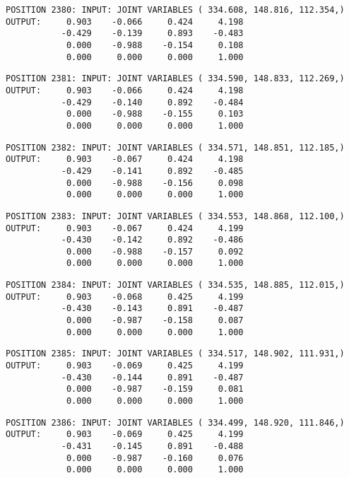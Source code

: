 \begin{verbatim}
POSITION 2380: INPUT: JOINT VARIABLES ( 334.608, 148.816, 112.354,)
OUTPUT:     0.903    -0.066     0.424     4.198
           -0.429    -0.139     0.893    -0.483
            0.000    -0.988    -0.154     0.108
            0.000     0.000     0.000     1.000
\end{verbatim} \pagebreak[1]\begin{verbatim}
POSITION 2381: INPUT: JOINT VARIABLES ( 334.590, 148.833, 112.269,)
OUTPUT:     0.903    -0.066     0.424     4.198
           -0.429    -0.140     0.892    -0.484
            0.000    -0.988    -0.155     0.103
            0.000     0.000     0.000     1.000
\end{verbatim} \pagebreak[1]\begin{verbatim}
POSITION 2382: INPUT: JOINT VARIABLES ( 334.571, 148.851, 112.185,)
OUTPUT:     0.903    -0.067     0.424     4.198
           -0.429    -0.141     0.892    -0.485
            0.000    -0.988    -0.156     0.098
            0.000     0.000     0.000     1.000
\end{verbatim} \pagebreak[1]\begin{verbatim}
POSITION 2383: INPUT: JOINT VARIABLES ( 334.553, 148.868, 112.100,)
OUTPUT:     0.903    -0.067     0.424     4.199
           -0.430    -0.142     0.892    -0.486
            0.000    -0.988    -0.157     0.092
            0.000     0.000     0.000     1.000
\end{verbatim} \pagebreak[1]\begin{verbatim}
POSITION 2384: INPUT: JOINT VARIABLES ( 334.535, 148.885, 112.015,)
OUTPUT:     0.903    -0.068     0.425     4.199
           -0.430    -0.143     0.891    -0.487
            0.000    -0.987    -0.158     0.087
            0.000     0.000     0.000     1.000
\end{verbatim} \pagebreak[1]\begin{verbatim}
POSITION 2385: INPUT: JOINT VARIABLES ( 334.517, 148.902, 111.931,)
OUTPUT:     0.903    -0.069     0.425     4.199
           -0.430    -0.144     0.891    -0.487
            0.000    -0.987    -0.159     0.081
            0.000     0.000     0.000     1.000
\end{verbatim} \pagebreak[1]\begin{verbatim}
POSITION 2386: INPUT: JOINT VARIABLES ( 334.499, 148.920, 111.846,)
OUTPUT:     0.903    -0.069     0.425     4.199
           -0.431    -0.145     0.891    -0.488
            0.000    -0.987    -0.160     0.076
            0.000     0.000     0.000     1.000
\end{verbatim} \pagebreak[1]\begin{verbatim}

\end{verbatim}
